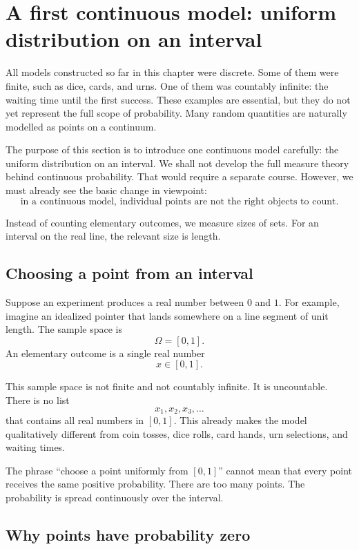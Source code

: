 \section{A first continuous model: uniform distribution on an interval}

All models constructed so far in this chapter were discrete. Some of them were
finite, such as dice, cards, and urns. One of them was countably infinite: the
waiting time until the first success. These examples are essential, but they do
not yet represent the full scope of probability. Many random quantities are
naturally modelled as points on a continuum.

The purpose of this section is to introduce one continuous model carefully: the
uniform distribution on an interval. We shall not develop the full measure theory
behind continuous probability. That would require a separate course. However, we
must already see the basic change in viewpoint:
\[
\text{in a continuous model, individual points are not the right objects to count.}
\]

Instead of counting elementary outcomes, we measure sizes of sets. For an
interval on the real line, the relevant size is length.

\subsection*{Choosing a point from an interval}

Suppose an experiment produces a real number between \(0\) and \(1\). For
example, imagine an idealized pointer that lands somewhere on a line segment of
unit length. The sample space is
\[
\Omega=[0,1].
\]
An elementary outcome is a single real number
\[
x\in[0,1].
\]

This sample space is not finite and not countably infinite. It is uncountable.
There is no list
\[
x_1,x_2,x_3,\ldots
\]
that contains all real numbers in \([0,1]\). This already makes the model
qualitatively different from coin tosses, dice rolls, card hands, urn selections,
and waiting times.

\begin{remarkbox}
The phrase ``choose a point uniformly from \([0,1]\)'' cannot mean that every
point receives the same positive probability. There are too many points. The
probability is spread continuously over the interval.
\end{remarkbox}

\subsection*{Why points have probability zero}

